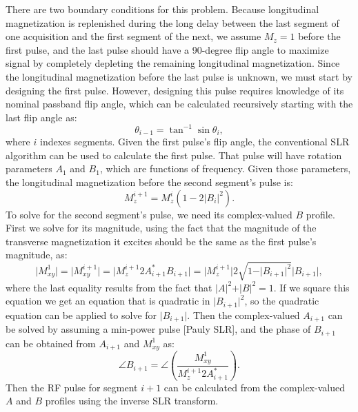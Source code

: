 \documentclass[11pt]{article}
\begin{document}
\par There are two boundary conditions for this problem. 
Because longitudinal magnetization is replenished during the long delay between the last segment of one acquisition and the first segment of the next, 
we assume $M_z = 1$ before the first pulse, 
and the last pulse should have a 90-degree flip angle to maximize signal by completely depleting the remaining longitudinal magnetization.
Since the longitudinal magnetization before the last pulse is unknown, 
we must start by designing the first pulse.
However, designing this pulse requires knowledge of its nominal passband flip angle,
which can be calculated recursively starting with the last flip angle as:
\begin{equation}
\theta_{i-1} = \tan^{-1} \sin \theta_i,
\label{eq:fliprecursion}
\end{equation}
where $i$ indexes segments.
Given the first pulse's flip angle, the conventional SLR algorithm can be used to calculate the first pulse. 
That pulse will have rotation parameters $A_1$ and $B_1$, which are functions of frequency.
Given those parameters, the longitudinal magnetization before the second segment's pulse is:
\begin{equation}
M_z^{i+1} = M_z^i \left( 1 - 2 \vert B_i \vert^2\right). 
\label{eq:mzrecursion}
\end{equation}
To solve for the second segment's pulse, 
we need its complex-valued $B$ profile. 
First we solve for its magnitude, 
using the fact that the magnitude of the transverse magnetization it excites should be the same as the first pulse's magnitude,
as:
\begin{equation}
\vert M_{xy}^1 \vert = \vert M_{xy}^{i+1} \vert =  \vert M_z^{i+1} 2 A^*_{i+1} B_{i+1} \vert = \vert M_z^{i+1} \vert 2 \sqrt{1 - \vert B_{i+1} \vert^2} \vert B_{i+1} \vert,
\end{equation}
where the last equality results from the fact that $\vert A \vert^2 + \vert B \vert^2 = 1$.
If we square this equation we get an 
equation that is quadratic in $\vert B_{i+1} \vert^2$, so the quadratic equation can be applied to solve for $\vert B_{i+1} \vert$.
Then the complex-valued $A_{i+1}$ can be solved by assuming a min-power pulse [Pauly SLR],
and the phase of $B_{i+1}$ can be obtained from $A_{i+1}$ and $M_{xy}^1$ as:
\begin{equation}
\angle B_{i+1} = \angle \left(\frac{M_{xy}^1}{M_z^{i+1} 2 A_{i+1}^* }\right).
\label{eq:bphase}
\end{equation}
Then the RF pulse for segment $i+1$ can be calculated from the complex-valued $A$ and $B$ profiles using the inverse SLR transform. 
\end{document}
